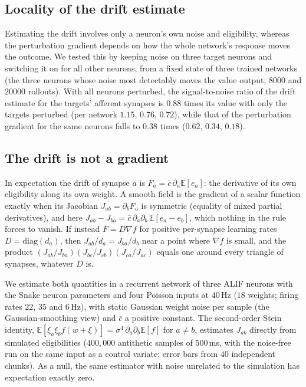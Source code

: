 \documentclass[10pt,twocolumn]{article}
\begin{document}
\subsection{Locality of the drift estimate}
\label{app:decomp-locality}
Estimating the drift involves only a neuron's own noise and eligibility, whereas the
perturbation gradient depends on how the whole network's response moves the
outcome. We tested this by keeping noise on three target neurons and switching it
on for all other neurons, from a fixed state of three trained networks (the three
neurons whose noise most detectably moves the value output; $8000$ and $20000$
rollouts). With all neurons perturbed, the signal-to-noise ratio of the drift
estimate for the targets' afferent synapses is $0.88$ times its value with only the
targets perturbed (per network $1.15$, $0.76$, $0.72$), while that of the
perturbation gradient for the same neurons falls to $0.38$ times ($0.62$, $0.34$,
$0.18$).

\subsection{The drift is not a gradient}
\label{app:drift-nongradient}
In expectation the drift of synapse $a$ is $F_a=\bar c\,\partial_a\mathbb{E}[e_a]$:
the derivative of its own eligibility along its own weight. A smooth field is the
gradient of a scalar function exactly when its Jacobian $J_{ab}=\partial_bF_a$ is
symmetric (equality of mixed partial derivatives), and here
$J_{ab}-J_{ba}=\bar c\,\partial_a\partial_b\,\mathbb{E}[e_a-e_b]$, which nothing in the
rule forces to vanish. If instead $F=D\nabla f$ for positive per-synapse learning
rates $D=\mathrm{diag}(d_a)$, then $J_{ab}/d_a=J_{ba}/d_b$ near a point where
$\nabla f$ is small, and the product
$(J_{ab}/J_{ba})(J_{bc}/J_{cb})(J_{ca}/J_{ac})$ equals one around every triangle of
synapses, whatever $D$ is.

We estimate both quantities in a recurrent network of three ALIF neurons with the
Snake neuron parameters and four Poisson inputs at $40$\,Hz ($18$ weights; firing
rates $22$, $35$ and $6$\,Hz), with static Gaussian weight noise per sample
(the Gaussian-smoothing view) and $\bar c$ a positive constant. The second-order
Stein identity, $\mathbb{E}[\xi_a\xi_b f(w+\xi)]=\sigma^4\,\partial_a\partial_b\mathbb{E}[f]$
for $a\neq b$, estimates $J_{ab}$ directly from simulated eligibilities ($400{,}000$
antithetic samples of $500$\,ms, with the noise-free run on the same input as a
control variate; error bars from $40$ independent chunks). As a null, the same
estimator with noise unrelated to the simulation has expectation exactly zero.
\end{document}
